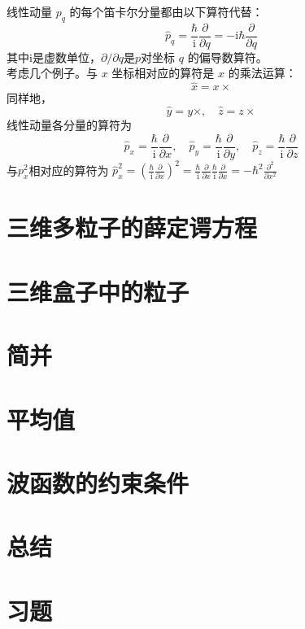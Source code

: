 	线性动量 $p_q$ 的每个笛卡尔分量都由以下算符代替：
	\begin{equation*}
		\hat{p}_q = \frac{\hbar}{\mathrm{i}}\frac{\partial}{\partial q} = -\mathrm{i}\hbar\frac{\partial}{\partial q}
	\end{equation*}	
	其中$\mathrm{i}$是虚数单位，$\partial / \partial q$是$p$对坐标 $q$ 的偏导数算符。\\
	\indent 考虑几个例子。与 $x$ 坐标相对应的算符是 $x$ 的乘法运算：
	\begin{equation}
		\boxed{
			\hat{x} = x \times
		}
		\label{eq:3.21}
	\end{equation}
	同样地，
	\begin{equation}
		\boxed{
			\hat{y} = y \times, \quad \hat{z} = z \times
		}
		\label{eq:3.22}
	\end{equation}
	线性动量各分量的算符为
	\begin{equation}
		\boxed{
			\hat{p}_x = \frac{\hbar}{\mathrm{i}}\frac{\partial}{\partial x}, \quad \hat{p}_y = \frac{\hbar}{\mathrm{i}}\frac{\partial}{\partial y}, \quad \hat{p}_z = \frac{\hbar}{\mathrm{i}}\frac{\partial}{\partial z}
		}
		\label{eq:3.23}
	\end{equation}
	与$p_x^2$相对应的算符为
	$\hat{p}_x^2 = \left(\frac{\hbar}{\mathrm{i}} \frac{\partial}{\partial x}\right)^2 = \frac{\hbar}{\mathrm{i}} \frac{\partial}{\partial x}\frac{\hbar}{\mathrm{i}} \frac{\partial}{\partial x} = -\hbar^2 \frac{\partial^2}{\partial x^2}$
	
	
	
	
	
	
\section{三维多粒子的薛定谔方程}

\section{三维盒子中的粒子}

\section{简并}

\section{平均值}

\section{波函数的约束条件}

\section*{总结}

\section*{习题}